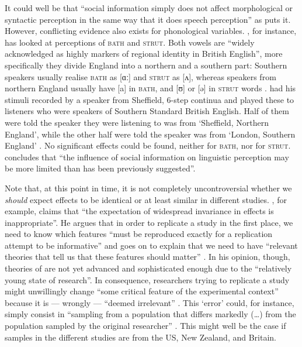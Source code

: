 It could well be that ``social information simply does not affect morphological or syntactic perception in the same way that it does speech perception'' as \textcite[229]{squires2013} puts it.
However, conflicting evidence also exists for phonological variables.
\textcite{lawrence2015}, for instance, has looked at perceptions of \textsc{bath} and \textsc{strut}.
Both vowels are ``widely acknowledged as highly  markers of regional identity in British English'', more specifically they divide England into a northern and a southern part: Southern speakers usually realise \textsc{bath} as [ɑː] and \textsc{strut} as [ʌ], whereas speakers from northern England usually have [a] in \textsc{bath}, and [ʊ] or [ə] in \textsc{strut} words \parencite[cf.][1]{lawrence2015}.
\citeauthor{lawrence2015} had his stimuli recorded by a speaker from Sheffield,  6-step  continua and played these to listeners who were speakers of Southern Standard British English.
Half of them were told the speaker they were listening to was from `Sheffield, Northern England', while the other half were told the speaker was from `London, Southern England' \parencite[cf.][2--3]{lawrence2015}.
No significant  effects could be found, neither for \textsc{bath}, nor for \textsc{strut}.
\textcite[cf.][4]{lawrence2015} concludes that ``the influence of social information on linguistic perception may be more limited than has been previously suggested''.

Note that, at this point in time, it is not completely uncontroversial whether we \emph{should} expect  effects to be identical or at least similar in different studies.
\textcite[45]{cesario2014}, for example, claims that ``the expectation of widespread invariance in  effects is inappropriate''.
He argues that in order to replicate a study in the first place, we need to know which features ``must be reproduced exactly for a replication attempt to be informative'' and goes on to explain that we need to have ``relevant theories that tell us that these features should matter'' \parencite[42]{cesario2014}.
In his opinion, though, theories of  are not yet advanced and sophisticated enough due to the ``relatively young state of  research''.
In consequence, researchers trying to replicate a study might unwillingly change ``some critical feature of the experimental context'' because it is --- wrongly --- ``deemed irrelevant'' \parencite[43]{cesario2014}.
This `error' could, for instance, simply consist in ``sampling from a population that differs markedly (\ldots) from the population sampled by the original researcher'' \parencite[43]{cesario2014}.
This might well be the case if samples in the different studies are from the US, New Zealand, and Britain.

